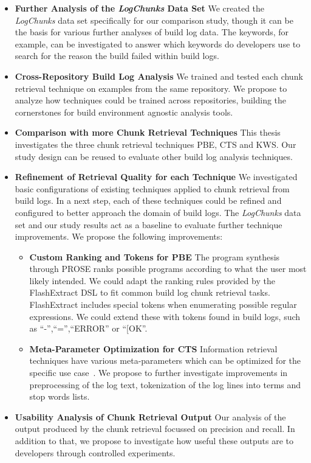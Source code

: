 \documentclass[\myrootdir/main.tex]{subfiles}
\begin{document}
\begin{itemize}
  \item \textbf{Further Analysis of the \emph{LogChunks} Data Set} We created the \emph{LogChunks} data set specifically for our comparison study, though it can be the basis for various further analyses of build log data.
  The keywords, for example, can be investigated to answer which keywords do developers use to search for the reason the build failed within build logs.
  \item \textbf{Cross-Repository Build Log Analysis} We trained and tested each chunk retrieval technique on examples from the same repository.
  We propose to analyze how techniques could be trained across repositories, building the cornerstones for build environment agnostic analysis tools.
  \item \textbf{Comparison with more Chunk Retrieval Techniques} This thesis investigates the three chunk retrieval techniques PBE, CTS and KWS\@.
  Our study design can be reused to evaluate other build log analysis techniques.
  \item \textbf{Refinement of Retrieval Quality for each Technique} We investigated basic configurations of existing techniques applied to chunk retrieval from build logs.
  In a next step, each of these techniques could be refined and configured to better approach the domain of build logs.
  The \emph{LogChunks} data set and our study results act as a baseline to evaluate further technique improvements.
  We propose the following improvements:
    \begin{itemize}
      \item \textbf{Custom Ranking and Tokens for PBE} The program synthesis through PROSE ranks possible programs according to what the user most likely intended.
      We could adapt the ranking rules provided by the FlashExtract DSL to fit common build log chunk retrieval tasks.
      FlashExtract includes special tokens when enumerating possible regular expressions.
      We could extend these with tokens found in build logs, such as ``-'',``='',``ERROR'' or ``[OK''.
      \item \textbf{Meta-Parameter Optimization for CTS} Information retrieval techniques have various meta-parameters which can be optimized for the specific use case~\cite{panichella2016parameterizing}.
      We propose to further investigate improvements in preprocessing of the log text, tokenization of the log lines into terms and stop words lists.
    \end{itemize}
  \item \textbf{Usability Analysis of Chunk Retrieval Output} Our analysis of the output produced by the chunk retrieval focussed on precision and recall.
  In addition to that, we propose to investigate how useful these outputs are to developers through controlled experiments.
\end{itemize}
\end{document}
